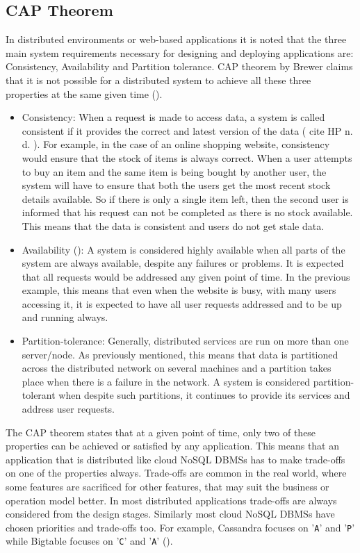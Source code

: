 \subsection{CAP Theorem} \label{ss:cap}
In distributed environments or web-based applications it is noted that the
three main system requirements necessary for designing and deploying
applications are: Consistency,   Availability and Partition tolerance.  CAP
theorem by Brewer claims that it is not possible for a distributed system to
achieve all these three properties at the same given time (). 

\begin{itemize}
  \item Consistency: When a request is made to access data,   a system is called
  consistent if it provides the correct and latest version of the data (\todo
  {cite HP n. d. }).  For example,   in the case of an online shopping website,  
  consistency would ensure that the stock of items is always correct.  When a
  user attempts to buy an item and the same item is being bought by another
  user,   the system will have to ensure that both the users get the most recent
  stock details available.  So if there is only a single item left,   then the
second user is informed that his request can not be completed as there is no
stock available.  This means that the data is consistent and users do not get
stale data. 
  \item Availability (): A system is considered
  highly available when all parts of the system are always available,   despite
  any failures or problems.  It is expected that all requests would be addressed
  any given point of time.  In the previous example,   this means that even when the
website is busy,   with many users accessing it,   it is expected to have all user
requests addressed and to be up and running always. 
\item Partition-tolerance: Generally,   distributed services are run on more than
one server/node.  As previously mentioned,   this means that data is partitioned
across the distributed network on several machines and a
partition takes place when there is a failure in the network.  A system is
considered partition-tolerant when despite such partitions,   it continues to provide its
services and address user requests.  
\end{itemize}

The CAP theorem states that at a given point of time,   only two of these
properties can be achieved or satisfied by any application.  This means that an
application that is distributed like cloud \ac{NoSQL} \acp{DBMS} has to make
trade-offs on one of the properties always.  Trade-offs are common in the real world,   where
some features are sacrificed for other features,   that may suit the
business or operation model better.  In most distributed applications trade-offs are always
considered from the design stages.   Similarly most cloud \ac{NoSQL} \acp{DBMS} have chosen
priorities and trade-offs too.  For example,   Cassandra focuses on '\texttt{A}'
and '\texttt{P}' while Bigtable focuses on '\texttt{C}' and '\texttt{A}'
(). 

